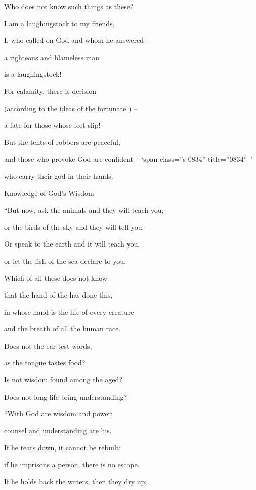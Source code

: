 {\par }{\Q Who
does not
know such
things as these?
\par }{\Q {}I am a laughingstock
to my friends,
\par }{\Q I, who called
on God
and whom he answered –
\par }{\Q a righteous
and blameless
man
\par }{\Q is a laughingstock!
\par }{\Q {}For calamity,
there is derision
\par }{\Q (according to the ideas
of the fortunate ) –
\par }{\Q a fate for those whose feet slip!
\par }{\Q {}But the tents
of robbers
are peaceful,
\par }{\Q and those who provoke
God
are confident – ‘span class=”s 0834” title=”0834” ’
\par }{\Q who
carry
their god
in their hands.
\par }{\SH Knowledge of God’s Wisdom
\par }{\Q {}“But now,
ask
the animals
and they will teach
you,
\par }{\Q or the birds
of the sky
and they will tell you.
\par }{\Q {}Or
speak
to the earth
and it will teach
you,
\par }{\Q or let the fish
of the sea
declare to you.
\par }{\Q {}Which
of all
these
does not
know
\par }{\Q that
the hand
of the
{}
has done
this,
\par }{\Q {}in whose
hand
is the life
of every
creature
\par }{\Q and the breath
of all
the human race.
\par }{\Q {}Does not
the ear
test
words,
\par }{\Q as the tongue
tastes
food?
\par }{\Q {}Is not wisdom
found among the aged?

\par }{\Q Does not long
life
bring understanding?
\par }{\Q {}“With
God are wisdom
and power;
\par }{\Q counsel
and understanding are his.
\par }{\Q {}If
he tears
down, it cannot
be rebuilt;
\par }{\Q if he imprisons
a person,
there is no
escape.
\par }{\Q {}If
he holds
back the waters,
then
they dry
up;

}

